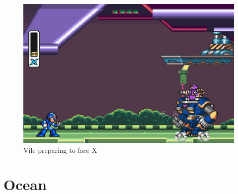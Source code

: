 \begin{figure}
	\centering
	\includegraphics[width=0.6\linewidth]{figures/X1/Highway_screenshot_3.jpg}
	\caption{Vile preparing to face X}
\end{figure}
 
\section{Ocean}
